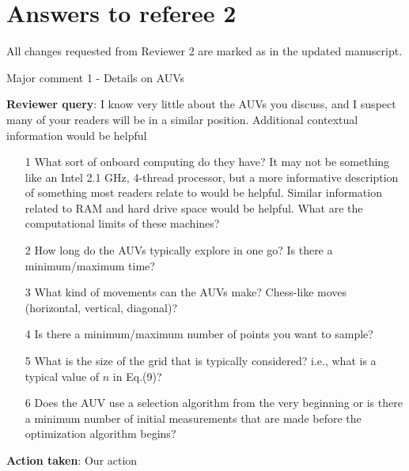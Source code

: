 \documentclass[a4paper]{article}
\newcounter{reviewer}
\def\reply{\textbf{Reviewer query}}
\def\action{\textbf{Action taken}}
\newcommand{\srevcomment}[1]{{\color{red}{\{Rev 2: #1\}}}}
\begin{document}
\section*{Answers to referee 2}
All changes requested from Reviewer 2 are marked as \srevcomment{red text}
in the updated manuscript.

\setcounter{reviewer}{2}

\begin{answers}
\item{Major comment 1 - Details on AUVs}\label{q12}

\reply: I know very little about the AUVs you discuss, and I suspect many of your readers will be in a similar position. Additional contextual information would be helpful

\begin{itemize}[noitemsep,topsep=0pt,parsep=0pt,partopsep=0pt]

\item[1] What sort of onboard computing do they have? It may not be something like an Intel 2.1 GHz, 4-thread processor, but a more informative description of something most readers relate to would be helpful. Similar information related to RAM and hard drive space would be helpful. What are the computational limits of these machines? 

\item[2] How long do the AUVs typically explore in one go? Is there a minimum/maximum time? 

\item[3] What kind of movements can the AUVs make? Chess-like moves (horizontal, vertical, diagonal)?  

\item[4] Is there a minimum/maximum number of points you want to sample?

\item[5] What is the size of the grid that is typically considered? i.e., what is a typical value of $n$ in Eq.(9)? 

\item[6] Does the AUV use a selection algorithm from the very beginning or is there a minimum number of initial measurements that are made before the optimization algorithm begins?

\end{itemize}

\action: Our action


\end{answers}
\end{document}
